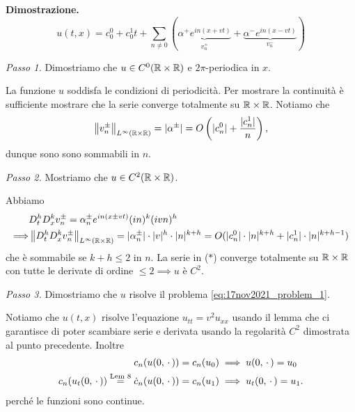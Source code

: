 \textbf{Dimostrazione.}
$$
	u(t,x) = c_0^0 + c_0^1 t + \sum_{n \neq  0} 
	(
	\underbrace{\alpha^+ e^{in(x + vt)}}_{v^+_n} 
	+ 
	\underbrace{\alpha^- e^{in(x - vt)}}_{v^-_n}
	)
$$

\textit{Passo 1.}
Dimostriamo che $u \in C^0(\mathbb R \times \mathbb R)$ e $2\pi$-periodica in $x$. 

La funzione $u$ soddisfa le condizioni di periodicità. Per mostrare la continuità è sufficiente mostrare che la serie converge totalmente su $\mathbb R \times \mathbb R$. Notiamo che
$$
	\left\lVert v^\pm_n \right\rVert_{L^\infty(\mathbb R \times \mathbb R)} = |\alpha^\pm| = O\left( |c_n^0| + \frac{|c_n^1|}{n} \right),
$$
dunque sono sono sommabili in $n$.

\textit{Passo 2.}
Mostriamo che $u \in C^2(\mathbb R \times \mathbb R)$. 

Abbiamo 
%
\begin{align*}
	& D_t^h D_x^k v_n^\pm = \alpha^\pm_n e^{in(x \pm vt)} (in)^k (ivn)^h \\
	\Longrightarrow & \left\lVert D_t^h D_x^k v^\pm_n \right\rVert_{L^\infty(\mathbb R \times \mathbb R)} = |\alpha^\pm_n| \cdot |v|^h \cdot |n|^{k+h}
	= O(|c_n^0| \cdot |n|^{k+h} + |c_n^1| \cdot |n|^{k + h - 1}) 
\end{align*}
%
che è sommabile se $k + h \leq 2$ in $n$. La serie in ($*$) converge totalmente su $\mathbb R \times \mathbb R$ con tutte le derivate di ordine $\leq 2 \implies u$ è $C^2$.

\textit{Passo 3.}
Dimostriamo che $u$ risolve il problema \eqref{eq:17nov2021_problem_1}.


Notiamo che $u(t,x)$ risolve l'equazione $u_{tt} = v^2 u_{xx}$ usando il lemma che ci garantisce di poter scambiare serie e derivata usando la regolarità $C^2$ dimostrata al punto precedente.
Inoltre
\begin{align*}
	c_n(u(0, \,\cdot\,)) = c_n(u_0) & \implies u(0, \,\cdot\,) = u_0 \\
	c_n(u_t(0, \,\cdot\,)) \overset{\text{Lem 8}}{=} \dot c_n (u(0,\,\cdot\,)) = c_n(u_1) & \implies u_t(0, \,\cdot\,) = u_1.
\end{align*}
perché le funzioni sono continue.


